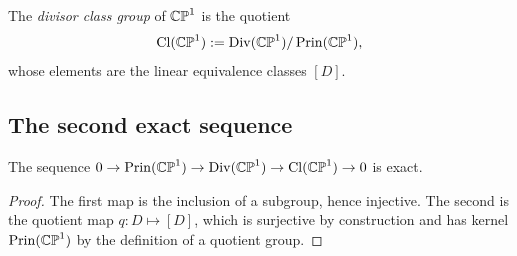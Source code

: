 \begin{definition}
The \emph{divisor class group} of $\mathbb{CP}^1$ is the quotient
\[
\operatorname{Cl}(\mathbb{CP}^1) := \operatorname{Div}(\mathbb{CP}^1)/\operatorname{Prin}(\mathbb{CP}^1),
\]
whose elements are the linear equivalence classes $[D]$.
\end{definition}

\subsection{The second exact sequence}

\begin{smjproposition}
The sequence
$0 \to \operatorname{Prin}(\mathbb{CP}^1) \to \operatorname{Div}(\mathbb{CP}^1) \to \operatorname{Cl}(\mathbb{CP}^1) \to 0$ is exact.
\end{smjproposition}

\begin{proof}
The first map is the inclusion of a subgroup, hence injective. The second is the
quotient map $q : D \mapsto [D]$, which is surjective by construction and has
kernel $\operatorname{Prin}(\mathbb{CP}^1)$ by the definition of a quotient group.
\end{proof}

